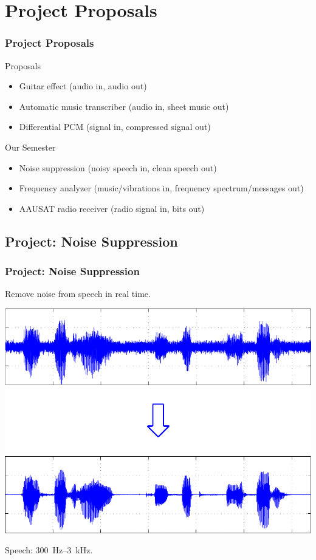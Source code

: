 \section{Project Proposals}

\begin{frame} \frametitle{Project Proposals}
    \begin{block}{Proposals}
        \begin{itemize}
        \item Guitar effect (audio in, audio out)
        \item Automatic music transcriber (audio in, sheet music out)
        \item Differential PCM (signal in, compressed signal out)
        \end{itemize}
    \end{block}
\pause
    \begin{block}{Our Semester}
        \begin{itemize}
        \item Noise suppression (noisy speech in, clean speech out)
        \item Frequency analyzer (music/vibrations in, frequency spectrum/messages out)
        \item AAUSAT radio receiver (radio signal in, bits out)
        \end{itemize}
    \end{block}
\end{frame}

\subsection{Project: Noise Suppression}
\begin{frame}
    \frametitle{Project: Noise Suppression}
    Remove noise from speech in real time.
    \begin{center}
        \includegraphics[scale=0.5]{img/noise_1}
    \end{center}
    Speech: \SI{300}{Hz}--\SI{3}{kHz}.
\end{frame}

